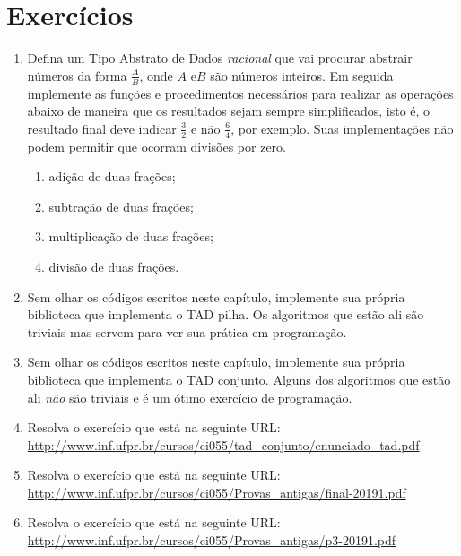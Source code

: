 \section{Exercícios}

\begin{enumerate}

\item Defina um Tipo Abstrato de Dados \emph{racional} que vai procurar
      abstrair números da forma $\frac{A}{B}$, onde $A$ e$B$ são
      números inteiros. Em seguida implemente as funções e procedimentos
      necessários para realizar as operações abaixo de maneira que os
      resultados sejam sempre simplificados, isto é, o resultado final
      deve indicar $\frac{3}{2}$ e não $\frac{6}{4}$, por exemplo. 
      Suas implementações não podem permitir que ocorram divisões por zero.
      \begin{enumerate}
          \item adição de duas frações;
          \item subtração de duas frações;
          \item multiplicação de duas frações;
          \item divisão de duas frações.
      \end{enumerate}

\item Sem olhar os códigos escritos neste capítulo, implemente sua 
      própria biblioteca que implementa o TAD pilha. Os algoritmos
      que estão ali são triviais mas servem para ver sua prática em 
      programação.

\item Sem olhar os códigos escritos neste capítulo, implemente sua 
      própria biblioteca que implementa o TAD conjunto. Alguns dos algoritmos
      que estão ali \emph{não} são triviais e é um ótimo exercício de 
      programação.

\item Resolva o exercício que está na seguinte URL: \\
\url{http://www.inf.ufpr.br/cursos/ci055/tad_conjunto/enunciado_tad.pdf}

\item Resolva o exercício que está na seguinte URL: \\
\url{http://www.inf.ufpr.br/cursos/ci055/Provas_antigas/final-20191.pdf}

\item Resolva o exercício que está na seguinte URL: \\
\url{http://www.inf.ufpr.br/cursos/ci055/Provas_antigas/p3-20191.pdf}


\end{enumerate}
